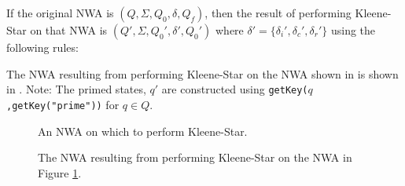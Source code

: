 \begin{changebar}
If the original NWA is $(Q, \Sigma, Q_0, \delta, Q_f)$,
then the result of performing Kleene-Star on that NWA is $(Q', \Sigma,
Q_0', \delta', Q_0')$ where $\delta' =
\{\delta_i',\delta_c',\delta_r'\}$ using the following rules:


\end{changebar}

\noindent The NWA resulting from performing Kleene-Star on the NWA shown in
 is shown in .  Note: The primed
states, $q'$ are constructed using \texttt{getKey($q$,getKey("prime"))} for
$q \in Q$.

\begin{figure}[p]
  \centering
  \caption{An NWA on which to perform Kleene-Star.}
  \label{Fi:Star1}
\end{figure}

\begin{figure}[p]
  \centering
  \caption{The NWA resulting from performing Kleene-Star on the NWA in Figure \ref{Fi:Star1}.}
  \label{Fi:Star2}
\end{figure}

